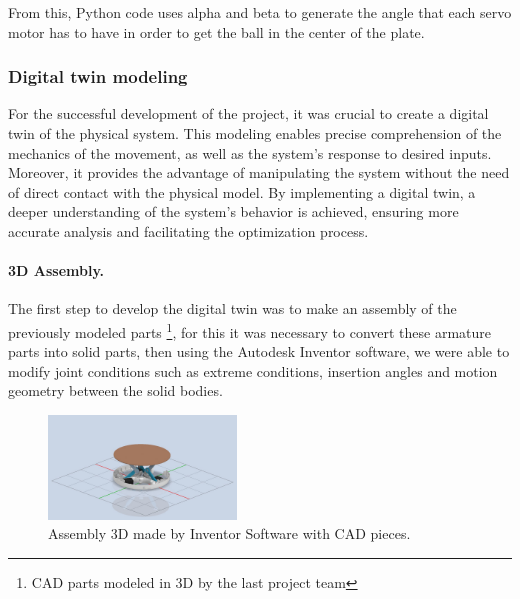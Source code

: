     From this, Python code\cite{link_systeme_2020} uses alpha and beta to generate the angle that each servo motor has to have in order to get the ball in the center of the plate.
    

    \subsubsection{Digital twin modeling} %

    For the successful development of the project, it was crucial to create a digital twin of the physical system. This modeling enables precise comprehension of the mechanics of the movement, as well as the system's response to desired inputs. Moreover, it provides the advantage of manipulating the system without the need of direct contact with the physical model. By implementing a digital twin, a deeper understanding of the system's behavior is achieved, ensuring more accurate analysis and facilitating the optimization process.

    \paragraph{3D Assembly.}

    The first step to develop the digital twin was to make an assembly of the previously modeled parts \footnote{CAD parts modeled in 3D by the last project team}, for this it was necessary to convert these armature parts into solid parts, then using the Autodesk Inventor software, we were able to modify joint conditions such as extreme conditions, insertion angles and motion geometry between the solid bodies. \newline

\begin{center}
    \begin{figure}[ht!]
        \centering
        \includegraphics[width=5cm, keepaspectratio]{imports/Inventor Assambly.jpg}
        \caption{Assembly 3D made by Inventor Software with CAD pieces.}
        \label{3D Inventor assembly figure}
    \end{figure}
\end{center}


